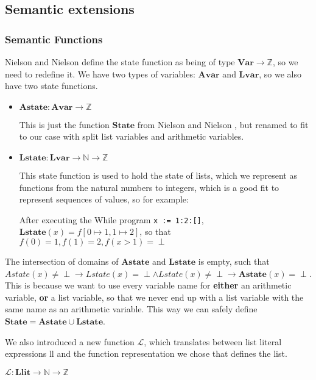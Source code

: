 \documentclass[12pt]{article}
\newcommand\mono\texttt
\newcommand{\metavar}[1]{\textlangle#1\textrangle}
\newcommand{\LL}{\mathcal{L}}
\newcommand{\Var}{\mathbf{Var}}
\newcommand{\Avar}{\mathbf{Avar}}
\newcommand{\Lvar}{\mathbf{Lvar}}
\newcommand{\State}{\mathbf{State}}
\newcommand{\Astate}{\mathbf{Astate}}
\newcommand{\Lstate}{\mathbf{Lstate}}
\newcommand{\Llit}{\mathbf{Llit}}
\begin{document}
\subsection{Semantic extensions} %

\subsubsection{Semantic Functions}

Nielson and Nielson define the state function as being of type $\Var \rightarrow \mathbb{Z}$, so we need to redefine it. We have two types of variables: $\Avar$ and $\Lvar$, so we also have two state functions.

\begin{itemize}
    \item $\Astate: \Avar \rightarrow \mathbb{Z}$

    This is just the function $\State$ from Nielson and Nielson \cite{wiley}, but renamed to fit to our case with split list variables and arithmetic variables.
    \item $\Lstate: \Lvar \rightarrow \mathbb{N} \rightarrow \mathbb{Z}$

    This state function is used to hold the state of lists, which we represent as functions from the natural numbers to integers, which is a good fit to represent sequences of values, so for example:

    After executing the While program \mono{x := 1:2:[]}, $\Lstate(x) = f[0 \mapsto 1, 1 \mapsto 2]$, so that $f(0) = 1, f(1) = 2, f(x > 1) = \perp$
\end{itemize}

The intersection of domains of $\Astate$ and $\Lstate$ is empty, such that $Astate(x) \neq \perp \rightarrow Lstate(x) = \perp \land Lstate(x) \neq \perp \rightarrow \Astate(x) = \perp$. This is because we want to use every variable name for \textbf{either} an arithmetic variable, \textbf{or} a list variable, so that we never end up with a list variable with the same name as an arithmetic variable. This way we can safely define $\State = \Astate \cup \Lstate$.

We also introduced a new function $\LL$, which translates between list literal expressions \metavar{ll} and the function representation we chose that defines the list.

$\LL: \Llit \rightarrow \mathbb{N} \rightarrow \mathbb{Z}$
\end{document}
